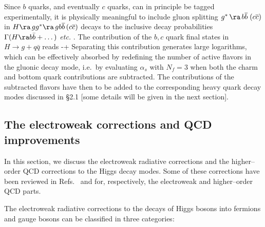 Since $b$ quarks, and eventually $c$ quarks, can in principle be tagged 
experimentally, it is physically meaningful to include gluon splitting $g^*\,
\ra\, b{\overline{b}} \; (c{\overline{c}})$ in $H \ra\,gg^*\ra\, gb{
\overline{b}} \, (c{\overline{c}})$ decays to the inclusive
decay probabilities $\Gamma(H \ra b\bar{b}+ \dots)$ {\it etc.} \cite{DSZ,SDGZ}.
The contribution of the $b,c$ quark final states in $H \to g+q\bar{q}$ reads
\beq
-+  
\label{ggsub}
\eeq
Separating this contribution generates large logarithms, which can be
effectively absorbed by redefining the number of active flavors in the gluonic
decay mode, i.e.~by evaluating $\alpha_s$ with $N_f=3$ when both the charm and
bottom quark contributions are subtracted. The contributions of the 
subtracted flavors have then to be added to the corresponding heavy quark decay 
modes discussed in \S2.1 [some details will be given in the next section]. 

\subsection{The electroweak corrections and QCD improvements}

In this section, we discuss the electroweak radiative corrections and the 
higher--order QCD corrections to the Higgs decay modes. Some of these 
corrections have been reviewed in Refs.~\cite{RCreviewEW} and 
\cite{Review-Michael,RCreviewQCD} for, respectively, the electroweak and 
higher--order  QCD parts.\s

The electroweak radiative corrections to the decays of Higgs bosons into
fermions and gauge bosons can be classified in three categories:

